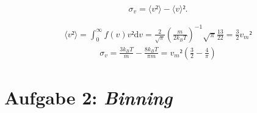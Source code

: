 \begin{itemize}
\begin{equation*}
\sigma_v=\langle v²\rangle-\langle v\rangle².
\end{equation*}

\begin{align*}
\langle v²\rangle=\int_{0}^\infty f(v)v²\text{d}v = \frac{2}{\sqrt{\pi}}\left(\frac{m}{2k_BT}\right)^{-1}\sqrt{\pi}\frac{13}{22} = \frac{3}{2}{v_m}²
\end{align*}
\begin{align*}
\sigma_v = \frac{3k_BT}{m} - \frac{8k_BT}{\pi m}={v_m}²\left(\frac{3}{2}-\frac{4}{\pi}\right)
\end{align*}




\end{itemize}


\section*{Aufgabe 2: \emph{Binning}}
